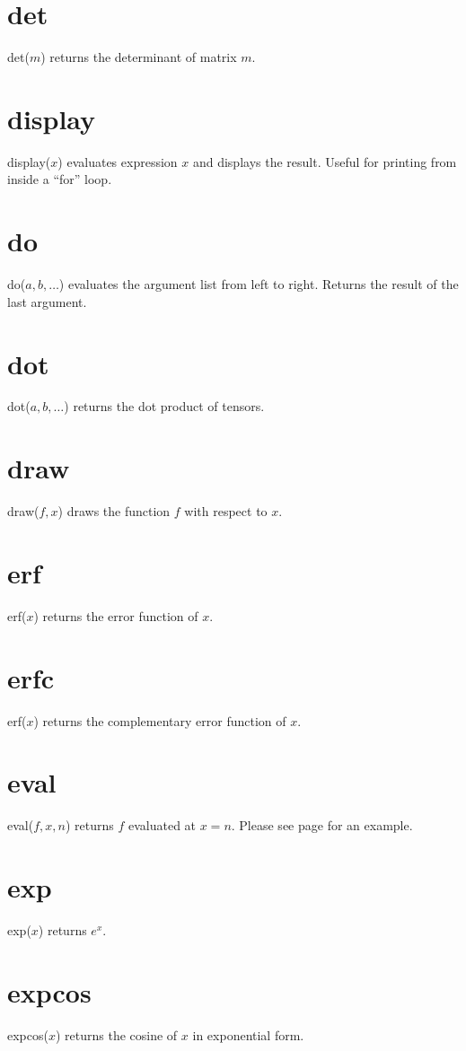 \documentclass[12pt,openany]{report}
\begin{document}
\section*{det}
det($m$) returns the determinant of matrix $m$.

\section*{display}
display($x$) evaluates expression $x$ and displays the result.
Useful for printing from inside a ``for'' loop.

\section*{do}
do($a,b,\ldots$) evaluates the argument list from left to right.
Returns the result of the last argument.

\section*{dot}
dot($a,b,\ldots$) returns the dot product of tensors.

\section*{draw}
draw($f,x$) draws the function $f$ with respect to $x$.

\section*{erf}
erf($x$) returns the error function of $x$.

\section*{erfc}
erf($x$) returns the complementary error function of $x$.

\section*{eval}
eval($f,x,n$) returns $f$ evaluated at $x=n$.
Please see page \pageref{integral} for an example.

\section*{exp}
exp($x$) returns $e^x$.

\section*{expcos}
expcos($x$) returns the cosine of $x$ in exponential form.
\end{document}
